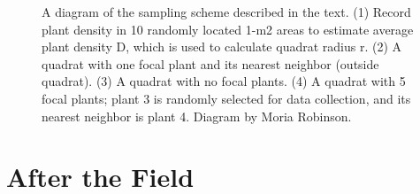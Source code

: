 \documentclass[
  letterpaper,
  oneside,
  open=any]{scrbook}
\begin{document}
\begin{figure}


\caption{\label{fig-sampling}A diagram of the sampling scheme described
in the text. (1) Record plant density in 10 randomly located 1-m2 areas
to estimate average plant density D, which is used to calculate quadrat
radius r. (2) A quadrat with one focal plant and its nearest neighbor
(outside quadrat). (3) A quadrat with no focal plants. (4) A quadrat
with 5 focal plants; plant 3 is randomly selected for data collection,
and its nearest neighbor is plant 4. Diagram by Moria Robinson.}

\end{figure}%

\section{After the Field}\label{after-the-field}
\end{document}
